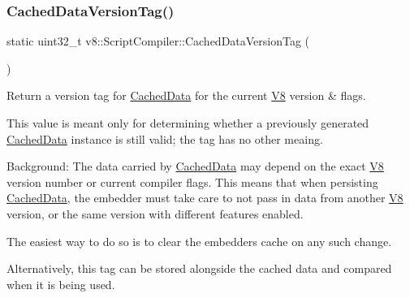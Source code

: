 \subsubsection{\texorpdfstring{Cached\+Data\+Version\+Tag()}{CachedDataVersionTag()}}
{\footnotesize\ttfamily static uint32\+\_\+t v8\+::\+Script\+Compiler\+::\+Cached\+Data\+Version\+Tag (\begin{DoxyParamCaption}{ }\end{DoxyParamCaption})\hspace{0.3cm}{\ttfamily [static]}}

Return a version tag for \mbox{\hyperlink{structv8_1_1ScriptCompiler_1_1CachedData}{Cached\+Data}} for the current \mbox{\hyperlink{classv8_1_1V8}{V8}} version \& flags.

This value is meant only for determining whether a previously generated \mbox{\hyperlink{structv8_1_1ScriptCompiler_1_1CachedData}{Cached\+Data}} instance is still valid; the tag has no other meaing.

Background\+: The data carried by \mbox{\hyperlink{structv8_1_1ScriptCompiler_1_1CachedData}{Cached\+Data}} may depend on the exact \mbox{\hyperlink{classv8_1_1V8}{V8}} version number or current compiler flags. This means that when persisting \mbox{\hyperlink{structv8_1_1ScriptCompiler_1_1CachedData}{Cached\+Data}}, the embedder must take care to not pass in data from another \mbox{\hyperlink{classv8_1_1V8}{V8}} version, or the same version with different features enabled.

The easiest way to do so is to clear the embedder\textquotesingle{}s cache on any such change.

Alternatively, this tag can be stored alongside the cached data and compared when it is being used. \mbox{\label{classv8_1_1ScriptCompiler_a217bcf520f4ed70f6f02afeabfe60319}} 
